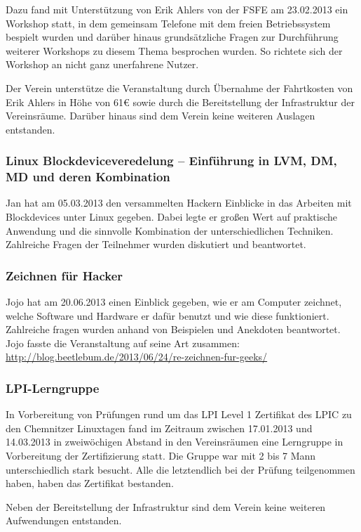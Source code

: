 \documentclass[10pt,DIV16]{scrartcl}
\begin{document}
Dazu fand mit Unterstützung von Erik Ahlers von der FSFE am 23.02.2013
ein Workshop statt, in dem gemeinsam Telefone mit dem freien
Betriebssystem bespielt wurden und darüber hinaus grundsätzliche
Fragen zur Durchführung weiterer Workshops zu diesem Thema
besprochen wurden. So richtete sich der Workshop an nicht ganz 
unerfahrene Nutzer.

Der Verein unterstütze die Veranstaltung durch Übernahme der
Fahrtkosten von Erik Ahlers in Höhe von 61\euro{} sowie durch die
Bereitstellung der Infrastruktur der Vereinsräume. Darüber hinaus
sind dem Verein keine weiteren Auslagen entstanden.

\subsubsection{Linux Blockdeviceveredelung -- Einführung in LVM, DM, MD und deren Kombination}

Jan hat am 05.03.2013 den versammelten Hackern Einblicke in das 
Arbeiten mit Blockdevices unter Linux gegeben. Dabei legte er großen 
Wert auf praktische Anwendung und die sinnvolle Kombination der 
unterschiedlichen Techniken. Zahlreiche Fragen der Teilnehmer wurden 
diskutiert und beantwortet. 


\subsubsection{Zeichnen für Hacker}

Jojo hat am 20.06.2013 einen Einblick gegeben, wie er am Computer 
zeichnet, welche Software und Hardware er dafür benutzt und wie diese 
funktioniert. Zahlreiche fragen wurden anhand von Beispielen und 
Anekdoten beantwortet. Jojo fasste die Veranstaltung auf seine Art 
zusammen: 
\url{http://blog.beetlebum.de/2013/06/24/re-zeichnen-fur-geeks/}

\subsubsection{LPI-Lerngruppe}

In Vorbereitung von Prüfungen rund um das LPI Level 1 Zertifikat des
LPIC zu den Chemnitzer Linuxtagen fand im Zeitraum zwischen
17.01.2013 und 14.03.2013 in zweiwöchigen Abstand in den Vereinsräumen
eine Lerngruppe in Vorbereitung der Zertifizierung statt. Die Gruppe
war mit 2 bis 7 Mann unterschiedlich stark besucht. Alle die
letztendlich bei der Prüfung teilgenommen haben, haben das
Zertifikat bestanden.

Neben der Bereitstellung der Infrastruktur sind dem Verein keine
weiteren Aufwendungen entstanden.
\end{document}
